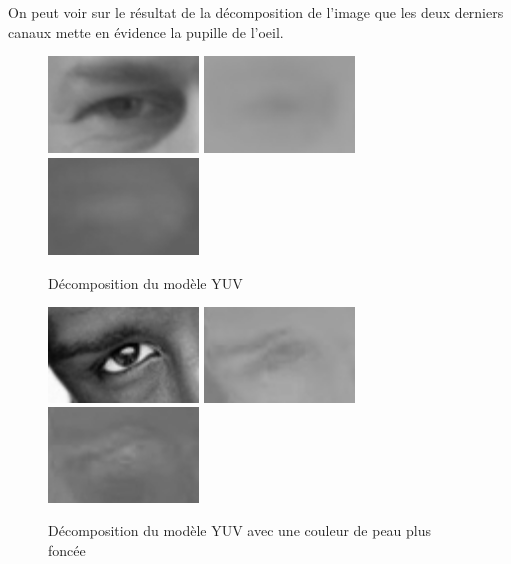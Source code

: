 On peut voir sur le résultat de la décomposition de l'image que les deux derniers canaux mette 
en évidence la pupille de l'oeil.
\begin{figure}[H]
 \center
 \includegraphics[width=4cm]{image/luminance.png}
 \includegraphics[width=4cm]{image/chrominance1.png}
 \includegraphics[width=4cm]{image/chrominance2.png}
 \caption{Décomposition du modèle YUV}
\end{figure}

\begin{figure}[H]
 \center
 \includegraphics[width=4cm]{image/luminance_black.png}
 \includegraphics[width=4cm]{image/chrominance1_black.png}
 \includegraphics[width=4cm]{image/chrominance2_black.png}
 \caption{Décomposition du modèle YUV avec une couleur de peau plus foncée}
\end{figure}


